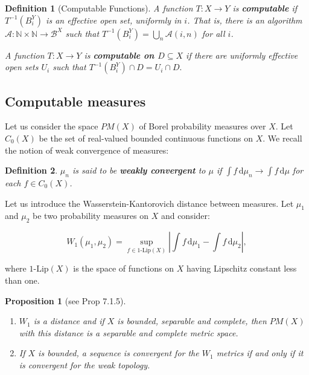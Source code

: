\documentclass[copyright,creativecommons]{eptcs}
\newtheorem{definition}{Definition}
\newtheorem{proposition}{Proposition}
\numberwithin{equation}{section}
\begin{document}
\begin{definition}[Computable Functions]
\label{comp_func} A function $T:X\rightarrow Y$ is \textbf{\emph{computable}}
if $T^{-1}(B_{i}^{Y})$ is an effective open set, uniformly in $i$. That is,
there is an algorithm $\mathcal{A}:\mathbb{N}\times \mathbb{N}\rightarrow
\mathcal{B}^{X}$ such that $T^{-1}(B_{i}^{Y})=\bigcup_{n}\mathcal{A}(i,n)$
for all $i$.

\noindent A function $T:X\rightarrow Y$ is \textbf{\emph{computable on $D\subseteq X$}} if there are uniformly effective open sets $U_{i}$ such that
$T^{-1}(B_{i}^{Y})\cap D=U_{i}\cap D.$
\end{definition}

\subsection{Computable measures\label{seccompmu}}

Let us consider the space $PM(X)$ of Borel probability measures over $X$.
Let $C_{0}(X)$ be the set of real-valued bounded continuous functions on $X$. We recall the notion of weak convergence of measures:

\begin{definition}
$\mu _{n}$ is said to be \emph{\textbf{weakly convergent}} to $\mu $ if $\int\!{f}\,\mathrm{d}{\mu_n}\rightarrow \int\!{f}\,\mathrm{d}{\mu}$ for each
$f\in C_{0}(X)$.
\end{definition}

Let us introduce the Wasserstein-Kantorovich distance between measures. Let $\mu _{1}$ and $\mu _{2}$ be two probability measures on $X$ and consider:

\begin{equation*}
W_{1}(\mu _{1},\mu _{2})=\underset{f\in 1\text{-Lip}(X)}{\sup }\left|\int\!{f}\,\mathrm{d}{\mu_1}-\int\!{f}\,\mathrm{d}{\mu _2}\right|,
\end{equation*}

\noindent where $1\mbox{-Lip}(X)$ is the space of functions on $X$ having
Lipschitz constant less than one.

\begin{proposition}[see \protect\cite{AGS} Prop 7.1.5]
\label{ambros}\mbox{}

\begin{enumerate}
\item $W_{1}$ is a distance and if $X$ is bounded, separable and complete,
then $PM(X) $ with this distance is a separable and complete metric space.

\item If $X$ is bounded, a sequence is convergent for the $W_{1}$ metrics if
and only if it is convergent for the weak topology.
\end{enumerate}
\end{proposition}
\end{document}
